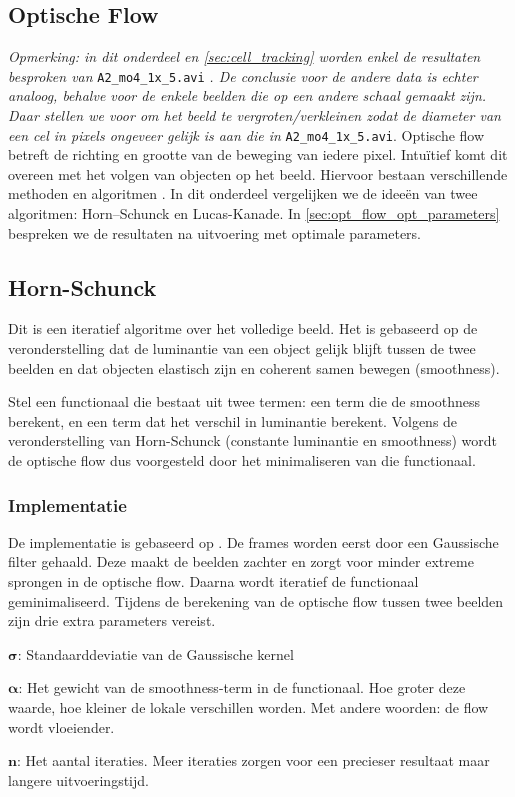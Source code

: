 \documentclass{article}
\begin{document}
\begin{multicols}{2}
\section{Optische Flow}
\textit{Opmerking: in dit onderdeel en \autoref{sec:cell_tracking} worden enkel de resultaten besproken van} \verb|A2_mo4_1x_5.avi| \textit{. De conclusie voor de andere data is echter analoog, behalve voor de enkele beelden die op een andere schaal gemaakt zijn. Daar stellen we voor om het beeld te vergroten/verkleinen zodat de diameter van een cel in pixels ongeveer gelijk is aan die in } \verb|A2_mo4_1x_5.avi|.
\newline
\newline
\noindent Optische flow betreft de richting en grootte van de beweging van iedere pixel. Intuïtief komt dit overeen met het volgen van objecten op het beeld. Hiervoor bestaan verschillende methoden en algoritmen \cite{opt_flow_multi_algos}. In dit onderdeel vergelijken we de ideeën van twee algoritmen: Horn–Schunck en Lucas-Kanade. In \autoref{sec:opt_flow_opt_parameters} bespreken we de resultaten na uitvoering met optimale parameters.
\subsection{Horn-Schunck}
Dit is een iteratief algoritme over het volledige beeld. Het is gebaseerd op de veronderstelling dat de luminantie van een object gelijk blijft tussen de twee beelden en dat objecten elastisch zijn en coherent samen bewegen (smoothness).

Stel een functionaal die bestaat uit twee termen: een term die de smoothness berekent, en een term dat het verschil in luminantie berekent. Volgens de veronderstelling van Horn-Schunck (constante luminantie en smoothness) wordt de optische flow dus voorgesteld door het minimaliseren van die functionaal.
\subsubsection{Implementatie}
De implementatie is gebaseerd op \cite{py_optflow_github}. De frames worden eerst door een Gaussische filter gehaald. Deze maakt de beelden zachter en zorgt voor minder extreme sprongen in de optische flow. Daarna wordt iteratief de functionaal geminimaliseerd. Tijdens de berekening van de optische flow tussen twee beelden zijn drie extra parameters vereist.
\begin{description}
   \item{$\boldsymbol\sigma$:} Standaarddeviatie van de Gaussische kernel
   \item{$\boldsymbol\alpha$:} Het gewicht van de smoothness-term in de functionaal. Hoe groter deze waarde, hoe kleiner de lokale verschillen worden. Met andere woorden: de flow wordt vloeiender.
   \item{$\mathbf{n}$:} Het aantal iteraties. Meer iteraties zorgen voor een precieser resultaat maar langere uitvoeringstijd.
\end{description}


\end{multicols}
\end{document}
